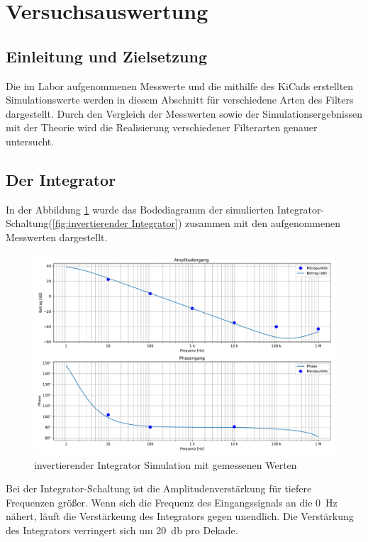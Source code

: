 \section{Versuchsauswertung}
%
\subsection{Einleitung und Zielsetzung}

Die im Labor aufgenommenen Messwerte und die mithilfe des KiCads erstellten Simulationswerte werden in diesem Abschnitt für verschiedene Arten des Filters dargestellt. Durch den Vergleich der Messwerten sowie der Simulationsergebnissen mit der Theorie wird die Realisierung verschiedener Filterarten genauer untersucht.

%

\subsection{Der Integrator}

In der Abbildung \ref{fig:invertierender Integrator_Simulation} wurde das Bodediagramm der simulierten Integrator-Schaltung(\ref{fig:invertierender Integrator}) zusammen mit den aufgenommenen Messwerten dargestellt.

\begin{figure}[H]
  \centering
  \includegraphics[width=0.8\linewidth]{Elektronik-Laborprotokoll_Filter/Plots/invertierender_Integrator_mit_Messwerten.pdf}
  \caption{invertierender Integrator Simulation mit gemessenen Werten}
  \label{fig:invertierender Integrator_Simulation}
\end{figure}
%
Bei der Integrator-Schaltung ist die Amplitudenverstärkung für tiefere Frequenzen größer. Wenn sich die Frequenz des Eingangssignals an die \SI{0}{\hertz} nähert, läuft die Verstärkeung des Integrators gegen unendlich. Die Verstärkung des Integrators verringert sich um \SI{20}{\decibel} pro Dekade.

